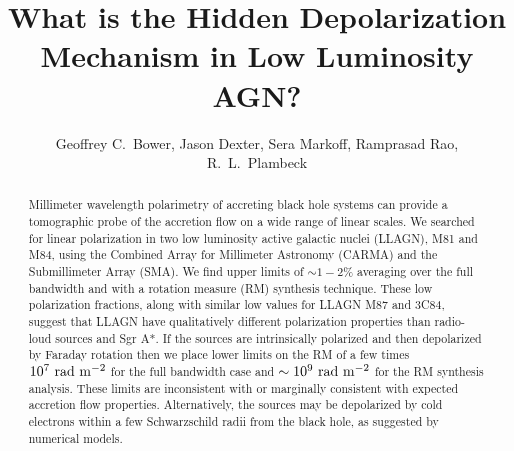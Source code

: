 \documentclass[12pt,preprint]{aastex}
\begin{document}
\newcommand\degd{\ifmmode^{\circ}\!\!\!.\,\else$^{\circ}\!\!\!.\,$\fi}
\newcommand{\etal}{{\it et al.\ }}
\newcommand{\uv}{(u,v)}
\newcommand{\rdm}{{\rm\ rad\ m^{-2}}}
\newcommand{\msuny}{{\rm\ M_{\sun}\ y^{-1}}}
\newcommand{\mylesssim}{\stackrel{\scriptstyle <}{\scriptstyle \sim}}
\newcommand{\lsim}{\stackrel{\scriptstyle <}{\scriptstyle \sim}}
\newcommand{\gsim}{\stackrel{\scriptstyle >}{\scriptstyle \sim}}
\newcommand{\sci}{Science}
\newcommand{\sgr}{PSR J1745-2900}
\newcommand{\sgra}{Sgr~A*}
\newcommand{\kms}{\ensuremath{{\rm km\,s}^{-1}}}
\newcommand{\masy}{\ensuremath{{\rm mas\,yr}^{-1}}}

\def\kbar{{\mathchar'26\mkern-9mu k}}
\def\totd{{\mathrm{d}}}





\title{What is the Hidden Depolarization Mechanism in Low Luminosity AGN?}
\author{
Geoffrey C.\ Bower,
Jason Dexter,
Sera Markoff,
Ramprasad Rao,
R.~L.~Plambeck 
}





\begin{abstract}
Millimeter wavelength polarimetry of accreting black hole systems can provide a tomographic probe 
of the accretion flow on a wide range of linear scales.  We searched for linear polarization in
two low luminosity active galactic nuclei (LLAGN), M81 and M84, using the Combined Array for Millimeter
Astronomy (CARMA) and the Submillimeter Array (SMA).  We find upper limits of $\sim 1 - 2\%$ averaging
over the full bandwidth and with a rotation measure (RM) synthesis technique.  These low polarization
fractions, along with similar low values for LLAGN M87 and 3C84, suggest that LLAGN have qualitatively
different polarization properties than radio-loud sources and Sgr A*.  If the sources are intrinsically polarized
and then depolarized by Faraday rotation then we place lower limits on the RM of a few times $10^7 \rdm$ for the full
bandwidth case and $\sim 10^9 \rdm$ for the RM synthesis analysis.  These limits are inconsistent with or marginally
consistent with expected accretion flow properties.  Alternatively, the sources may be 
depolarized by cold electrons within a few Schwarzschild radii from the black hole, as suggested by numerical models.
\end{abstract}
\end{document}
